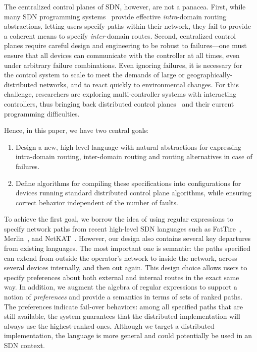 \documentclass[10pt]{sigalternate052015}
\begin{document}
The centralized control planes of SDN, however, are not a panacea.
First, while many SDN programming systems~\cite{sdn-languages} provide effective \emph{intra}-domain routing
abstractions, letting users specify paths within their network,
they fail to provide a coherent means to specify \emph{inter}-domain routes.
Second, centralized control planes
require careful design and engineering to be robust to failures---one must ensure that all devices can communicate with the controller at all times, even under arbitrary failure combinations. Even ignoring failures, it is necessary for the control system to
scale to meet the demands of large or geographically-distributed networks,
and to react quickly
to environmental changes. For this challenge, researchers are exploring
multi-controller systems with interacting controllers, thus bringing back distributed
control planes~\cite{mccauley2013extending,onos} and their current programming difficulties.

Hence, in this paper, we have two central goals:
\begin{enumerate}
\item Design a new, high-level language with natural abstractions
for expressing intra-domain routing, inter-domain
routing and routing alternatives in case of failures.
\item Define algorithms for compiling these specifications into
configurations for devices running standard
distributed control plane algorithms, while ensuring correct behavior
independent of the number of faults.
\end{enumerate}

To achieve the first goal, we borrow the idea of using regular
expressions to specify network paths from
recent high-level SDN languages such as FatTire~\cite{fattire},
Merlin~\cite{foster:merlin}, and
NetKAT~\cite{netkat}.  However, our design also contains several key
departures from existing languages.  The most important one is semantic:  the paths specified
can extend from outside the operator's network to inside
the network, across several devices internally, and then out again. This design
choice allows users to specify preferences about both external and internal
routes in the exact same way.
In addition, we augment the algebra
of regular expressions to support a notion of {\em preferences} and provide a semantics in terms of sets of ranked paths. The preferences indicate fail-over behaviors:  among all specified paths that are still available,
the system guarantees that the distributed implementation will always use the highest-ranked ones.
Although we target a distributed implementation, the language is more general and could potentially be used in an SDN context.
\end{document}
